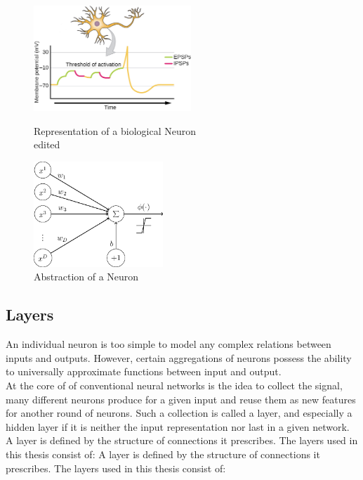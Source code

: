 \begin{figure}
	\centering
	\begin{minipage}{0.45\textwidth}
		\centering
		\includegraphics[height=150px]{gfx/Biological_Neuron_edited.jpg}
		\caption{Representation of a biological Neuron\\
			\cite{biology} edited}
		\label{fig:neuron1}
	\end{minipage}\hfill
	\begin{minipage}{0.45\textwidth}
		\centering
		\includegraphics[height=150px]{gfx/Abstract_Neuron.png}
		\caption{Abstraction of a Neuron\\
			\cite{abstract_neuron}}
		\label{fig:neuron2}
	\end{minipage}
\end{figure}

\subsection{Layers}
An individual neuron is too simple to model any complex relations between inputs and outputs. However, certain aggregations of neurons possess the ability to universally approximate functions between input and output.\cite{Approximator}\\
At the core of of conventional neural networks is the idea to collect the signal, many different neurons produce for a given input and reuse them as new features for another round
of neurons. Such a collection is called a layer, and especially a hidden layer if it is neither the input representation nor last in a given network.
A layer is defined by the structure of connections it prescribes. The layers used in this thesis consist of:
A layer is defined by the structure of connections it prescribes. The layers used in this thesis consist of:

